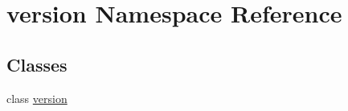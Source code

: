 \hypertarget{namespaceversion}{}\section{version Namespace Reference}
\label{namespaceversion}
\subsection*{Classes}
\begin{DoxyCompactItemize}
\item 
class \hyperlink{classversion_1_1version}{version}
\end{DoxyCompactItemize}
